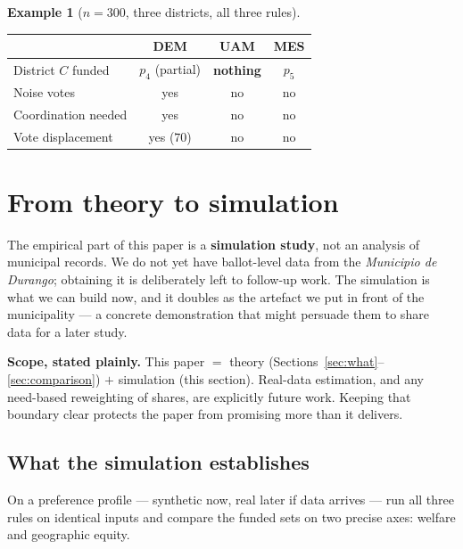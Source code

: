 \documentclass[11pt,letterpaper]{article}
\theoremstyle{definition}
\newtheorem{example}{Example}[section]
\theoremstyle{plain}
\theoremstyle{remark}
\begin{document}
\begin{example}[$n=300$, three districts, all three rules]
\medskip
\begin{center}\small\renewcommand{\arraystretch}{1.2}
\begin{tabular}{lccc}
\toprule
 & DEM & UAM & MES\\
\midrule
District $C$ funded & $p_4$ (partial) & \textbf{nothing} & $p_5$\\
Noise votes & yes & no & no\\
Coordination needed & yes & no & no\\
Vote displacement & yes ($70$) & no & no\\
\bottomrule
\end{tabular}
\end{center}
\end{example}

\section{From theory to simulation}
\label{sec:sim}

The empirical part of this paper is a \textbf{simulation study}, not an analysis of municipal
records. We do not yet have ballot-level data from the \emph{Municipio de Durango}; obtaining it is
deliberately left to follow-up work. The simulation is what we can build now, and it doubles as the
artefact we put in front of the municipality --- a concrete demonstration that might persuade them to
share data for a later study.

\begin{aside}\small
\textbf{Scope, stated plainly.} This paper $=$ theory (Sections~\ref{sec:what}--\ref{sec:comparison})
$+$ simulation (this section). Real-data estimation, and any need-based reweighting of shares, are
explicitly future work. Keeping that boundary clear protects the paper from promising more than it
delivers.
\end{aside}

\subsection{What the simulation establishes}

On a preference profile --- synthetic now, real later if data arrives --- run all three rules on
identical inputs and compare the funded sets on two precise axes: welfare and geographic equity.
\end{document}
